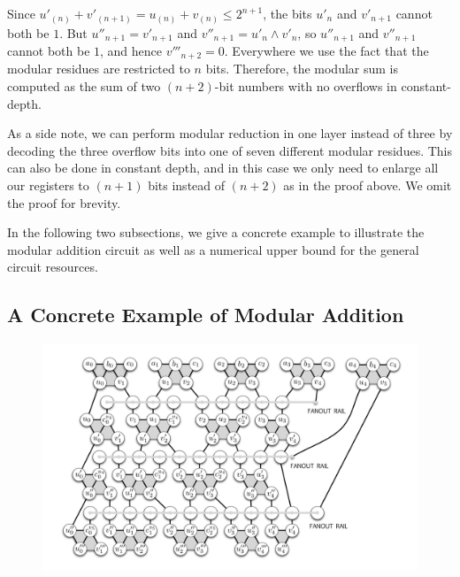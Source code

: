 \documentclass[twoside]{article}
\begin{document}
Since $u'_{(n)} + v'_{(n+1)} =
u_{(n)} + v_{(n)} \le 2^{n+1}$, the bits $u'_n$ and $v'_{n+1}$ cannot both be $1$.
But $u''_{n+1} = v'_{n+1}$ and $v''_{n+1} = u'_n\land v'_n$, so $u''_{n+1}$ and
$v''_{n+1}$ cannot both be $1$, and hence $v'''_{n+2} = 0$.
Everywhere
we use the fact that the modular residues are restricted to $n$ bits.
Therefore, the modular sum is computed as the sum of two $(n+2)$-bit numbers
with no overflows in constant-depth.
\square\,

As a side note, we can perform modular reduction in one layer instead of
three by decoding the three overflow bits into one of seven different
modular residues. This can also be done in constant depth, and in this case
we only need to enlarge all our registers to $(n+1)$ bits instead of $(n+2)$
as in the proof above. We omit the proof for brevity.

In the following two subsections, we give a concrete example to illustrate
the modular addition circuit as well as a numerical upper bound for the
general circuit resources.

\subsection{A Concrete Example of Modular Addition}
\label{subsec:concrete}

\begin{center}
\begin{figure}[h!bt]
\centerline{
\includegraphics[width=6.5in]{./mod-add-fixed.pdf}
}
\label{fig:csa-add-4}
\end{figure}
\end{center}
\end{document}

